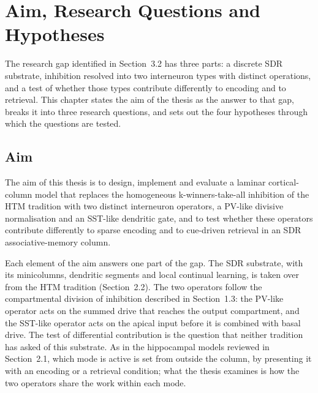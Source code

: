 \providecommand{\unitname}{chapter}
\providecommand{\xsec}[2]{#1}
\setlength{\emergencystretch}{1.5em} %

\chapter{Aim, Research Questions and Hypotheses}
\label{chap:aims}

The research gap identified in Section~\xsec{3.2}{sec:gap-open} has three parts:
a discrete SDR substrate, inhibition resolved into two interneuron types with
distinct operations, and a test of whether those types contribute differently
to encoding and to retrieval. This \unitname{} states the aim of the thesis as
the answer to that gap, breaks it into three research questions, and sets out
the four hypotheses through which the questions are tested.

\section{Aim}
\label{sec:aims-aim}

The aim of this thesis is to design, implement and evaluate a laminar
cortical-column model that replaces the homogeneous k-winners-take-all
inhibition of the HTM tradition with two distinct interneuron operators, a
PV-like divisive normalisation and an SST-like dendritic gate, and to test
whether these operators contribute differently to sparse encoding and to
cue-driven retrieval in an SDR associative-memory column.

Each element of the aim answers one part of the gap. The SDR substrate, with
its minicolumns, dendritic segments and local continual learning, is taken over
from the HTM tradition (Section~\xsec{2.2}{sec:comp-htm}). The two operators
follow the compartmental division of inhibition described in
Section~\xsec{1.3}{sec:bio-inhibitory}: the PV-like operator acts on the summed
drive that reaches the output compartment, and the SST-like operator acts on
the apical input before it is combined with basal drive. The test of
differential contribution is the question that neither tradition has asked of
this substrate. As in the hippocampal models reviewed in
Section~\xsec{2.1}{sec:comp-scope}, which mode is active is set from outside the
column, by presenting it with an encoding or a retrieval condition; what the
thesis examines is how the two operators share the work within each mode.


